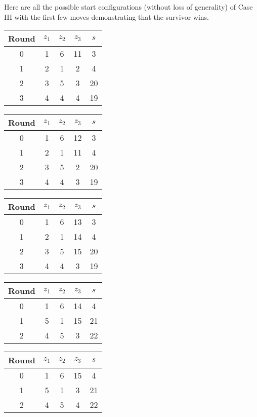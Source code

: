 
Here \label{appendix:planarZombies} are all the possible start configurations (without loss of generality) of Case III with the first few moves demonstrating that the survivor wins.

\begin{multicols}{2}

\begin{tabular}{c | c | c | c | c }
Round & $z_1$ & $z_2$ & $z_3$ & $s$ \\
\hline
0 & 1 & 6 & 11 & 3 \\
1 & 2 & 1 & 2 & 4 \\
2 & 3 & 5 & 3 & 20 \\
3 & 4 & 4 & 4 & 19
\end{tabular}


\begin{tabular}{c | c | c | c | c }
Round & $z_1$ & $z_2$ & $z_3$ & $s$ \\
\hline
0 & 1 & 6 & 12 & 3 \\
1 & 2 & 1 & 11 & 4 \\
2 & 3 & 5 & 2 & 20 \\
3 & 4 & 4 & 3 & 19
\end{tabular}


\begin{tabular}{c | c | c | c | c }
Round & $z_1$ & $z_2$ & $z_3$ & $s$ \\
\hline
0 & 1 & 6 & 13 & 3 \\
1 & 2 & 1 & 14 & 4 \\
2 & 3 & 5 & 15 & 20 \\
3 & 4 & 4 & 3 & 19
\end{tabular}


\begin{tabular}{c | c | c | c | c }
Round & $z_1$ & $z_2$ & $z_3$ & $s$ \\
\hline
0 & 1 & 6 & 14 & 4 \\
1 & 5 & 1 & 15 & 21 \\
2 & 4 & 5 & 3 & 22 \\
\end{tabular}


\begin{tabular}{c | c | c | c | c }
Round & $z_1$ & $z_2$ & $z_3$ & $s$ \\
\hline
0 & 1 & 6 & 15 & 4 \\
1 & 5 & 1 & 3 & 21 \\
2 & 4 & 5 & 4 & 22 \\
\end{tabular}



\end{multicols}
